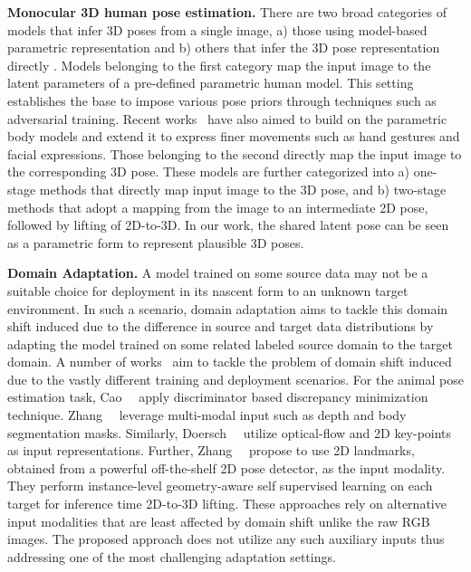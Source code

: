 \documentclass{article}
\begin{document}
\textbf{Monocular 3D human pose estimation.}
There are two broad categories of
models that infer 3D poses from a single image, \ie a) those using model-based parametric representation \cite{6909612, 6619308, SMPL-X:2019, Bogo2016KeepIS} and b) others that infer the 3D pose representation directly \cite{Rosales2001LearningBP, 1542030, 5206699}.
Models belonging to the first category map the input image to the latent parameters of a pre-defined parametric human model. This setting establishes the base to impose various pose priors through techniques such as adversarial training. Recent works~\cite{8578966, 8953319} have also aimed to build on the parametric body models and extend it to express finer movements such as hand gestures and facial expressions. Those belonging to the second directly map the input image to the corresponding 3D pose. These models are further categorized into a) one-stage methods \cite{Zhou_2017_ICCV, sun2018integral, 8099622, 8237635, pavlakos2018ordinal, 8578649} that directly map input image to the 3D pose, and b) two-stage methods \cite{zhaoCVPR19semantic, martinez2017simple, moreno20173d,sun2018integral} that adopt a mapping from the image to an intermediate 2D pose, followed by lifting of 2D-to-3D. 
In our work, the shared latent pose can be seen as a parametric form to represent plausible 3D poses. 


\textbf{Domain Adaptation.} 
A model trained on some source data may not be a suitable choice for deployment in its nascent form to an unknown target environment. In such a scenario, domain adaptation aims to tackle this domain shift induced due to the difference in source and target data distributions by adapting the model trained on some related labeled source domain to the target domain. A number of works~\cite{kundu2019_um_adapt} aim to tackle the problem of domain shift induced due to the vastly different training and deployment scenarios. For the animal pose estimation task, Cao~\etal~\cite{cao2019cross} apply discriminator based discrepancy minimization technique. Zhang~\etal~\cite{mm_domain19} leverage multi-modal input such as depth and body segmentation masks. Similarly, Doersch~\etal~\cite{NIPS2019_9454} utilize optical-flow and 2D key-points as input representations. Further,  Zhang~\etal~\cite{zhang2020inference} propose to use 2D landmarks, obtained from a powerful off-the-shelf 2D pose detector, as the input modality. They perform instance-level geometry-aware self supervised learning on each target for inference time 2D-to-3D lifting. These approaches rely on alternative input modalities that are least affected by domain shift unlike the raw RGB images. The proposed approach does not utilize any such auxiliary inputs thus addressing one of the most challenging adaptation settings.
\end{document}
